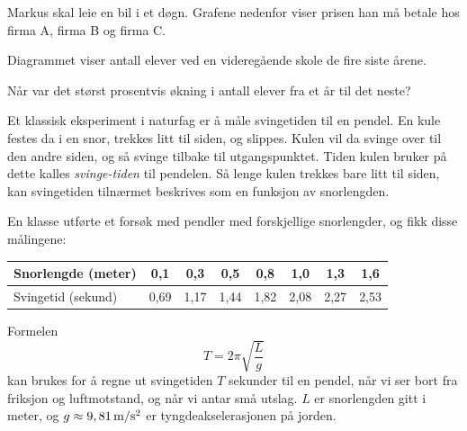 \newpage

Markus skal leie en bil i et døgn. Grafene nedenfor viser prisen han må betale hos
firma A, firma B og firma C.


\newpage
{}
Diagrammet viser antall elever ved en videregående skole de fire siste årene.\os

Når var det størst prosentvis økning i antall elever fra et år til det neste?

\newpage
{}
Et klassisk eksperiment i naturfag er å måle svingetiden til en pendel. En kule festes da i en snor, trekkes litt til siden, og slippes. Kulen vil da svinge over til den andre siden, og så svinge tilbake til utgangspunktet. Tiden kulen bruker på dette kalles \textsl{svinge-tiden} til pendelen. Så lenge kulen trekkes bare litt til siden, kan svingetiden tilnærmet beskrives som en funksjon av snorlengden. \vsk

En klasse utførte et forsøk med pendler med forskjellige snorlengder, og fikk disse målingene:
\begin{center}
\begin{tabular}{|l|c|c|c|c|c|c|c|}
	\hline
	Snorlengde (meter) & 0,1 & 0,3 & 0,5 & 0,8 & 1,0 & 1,3 & 1,6 \\
	\hline
	Svingetid (sekund) & 0,69 & 1,17 & 1,44 & 1,82 & 2,08 & 2,27 & 2,53 \\
	\hline
\end{tabular}
\end{center}
Formelen
\[ T =2\pi\sqrt{\frac{L}{g}} \]
kan brukes for å regne ut svingetiden $T$ sekunder til en pendel, når vi ser bort fra friksjon og
luftmotstand, og når vi antar små utslag. $L$ er snorlengden gitt i meter, og $g\approx 9,81\,\text{m}/\text{s}^2$ er tyngdeakselerasjonen på jorden.

